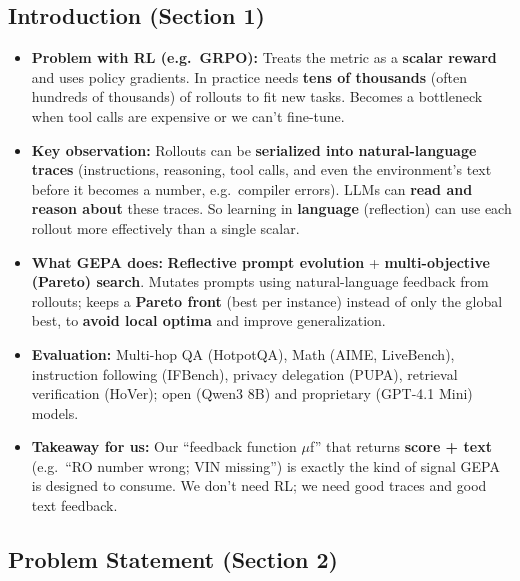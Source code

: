 \documentclass[11pt,a4paper]{article}
\begin{document}
\subsection{Introduction (Section 1)}

\begin{itemize}
  \item \textbf{Problem with RL (e.g.\ GRPO):} Treats the metric as a \textbf{scalar reward} and uses policy gradients. In practice needs \textbf{tens of thousands} (often hundreds of thousands) of rollouts to fit new tasks. Becomes a bottleneck when tool calls are expensive or we can't fine-tune.
  \item \textbf{Key observation:} Rollouts can be \textbf{serialized into natural-language traces} (instructions, reasoning, tool calls, and even the environment's text before it becomes a number, e.g.\ compiler errors). LLMs can \textbf{read and reason about} these traces. So learning in \textbf{language} (reflection) can use each rollout more effectively than a single scalar.
  \item \textbf{What GEPA does:} \textbf{Reflective prompt evolution} + \textbf{multi-objective (Pareto) search}. Mutates prompts using natural-language feedback from rollouts; keeps a \textbf{Pareto front} (best per instance) instead of only the global best, to \textbf{avoid local optima} and improve generalization.
  \item \textbf{Evaluation:} Multi-hop QA (HotpotQA), Math (AIME, LiveBench), instruction following (IFBench), privacy delegation (PUPA), retrieval verification (HoVer); open (Qwen3 8B) and proprietary (GPT-4.1 Mini) models.
  \item \textbf{Takeaway for us:} Our ``feedback function $\mu$f'' that returns \textbf{score + text} (e.g.\ ``RO number wrong; VIN missing'') is exactly the kind of signal GEPA is designed to consume. We don't need RL; we need good traces and good text feedback.
\end{itemize}

\subsection{Problem Statement (Section 2)}
\end{document}
